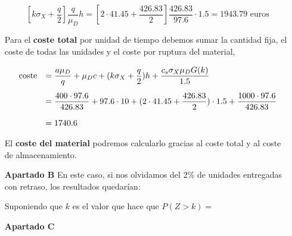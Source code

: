 \documentclass[a4paper,12pt]{article}
\begin{document}
\begin{itemize}
$$\left[k\sigma_X + \dfrac{q}{2}\right] \dfrac{q}{\mu_D} h = \left[2\cdot 41.45 + \dfrac{426.83}{2} \right] \dfrac{426.83}{97.6} \cdot 1.5 = 1943.79 \text{ euros}$$


Para el \textbf{coste total} por unidad de tiempo debemos sumar la cantidad fija, el coste de todas las unidades y el coste por ruptura del material,

\begin{equation*}
\begin{array}{l l}
\text{coste} & =  \dfrac{a\mu_D}{q} + \mu_D c + (k\sigma_X + \dfrac{q}{2}) h + \dfrac{c_s\sigma_X \mu_D G(k)}{1.5} \\[.5cm]
\, & = \dfrac{400\cdot 97.6}{426.83} + 97.6\cdot 10 + (2\cdot 41.45 + \dfrac{426.83}{2})\cdot 1.5 + \dfrac{1000\cdot 97.6}{426.83} \\[.5cm]
\, & = 1740.6
\end{array}
\end{equation*}

El \textbf{coste del material} podremos calcularlo gracias al coste total y al coste de almacenamiento. 




\item[\textbf{Apartado B}]
En este caso, si nos olvidamos del 2\% de unidades entregadas con retraso, los resultados quedar\'ian:

Suponiendo que $k$ es el valor que hace que $P(Z > k) = $


\item[\textbf{Apartado C}]

     
\end{itemize}
\end{document}

